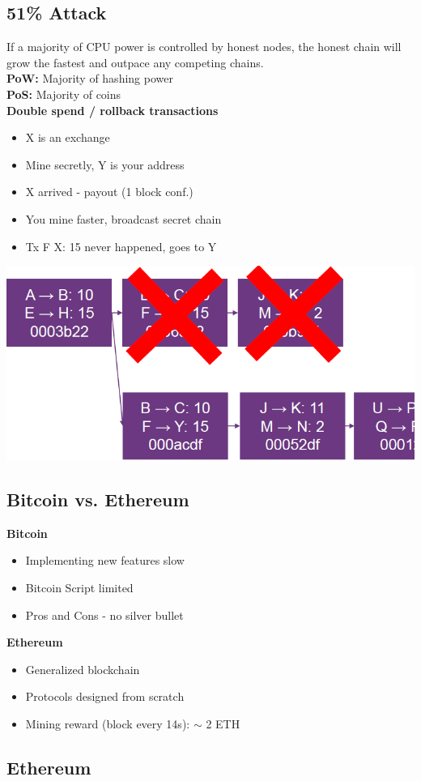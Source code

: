\subsection{51\% Attack}
If a majority of CPU power is controlled by honest nodes, the honest chain will grow the fastest and outpace any competing chains.\\
\textbf{PoW:} Majority of hashing power\\
\textbf{PoS:} Majority of coins\\
\textbf{Double spend / rollback transactions}
\begin{itemize}
    \item X is an exchange
    \item Mine secretly, Y is your address
    \item X arrived - payout (1 block conf.)
    \item You mine faster, broadcast secret chain
    \item Tx F \textrightarrow X: 15 never happened, goes to Y
\end{itemize}
\includegraphics[width=0.6\linewidth]{img/51_percent_attack.png}

\subsection{Bitcoin vs. Ethereum}
\textbf{Bitcoin}
\begin{itemize}
    \item Implementing new features slow
    \item Bitcoin Script limited
    \item Pros and Cons - no silver bullet
\end{itemize}
\textbf{Ethereum}
\begin{itemize}
    \item Generalized blockchain
    \item Protocols designed from scratch
    \item Mining reward (block every 14s): $\sim$ 2 ETH
\end{itemize}

\subsection{Ethereum}
